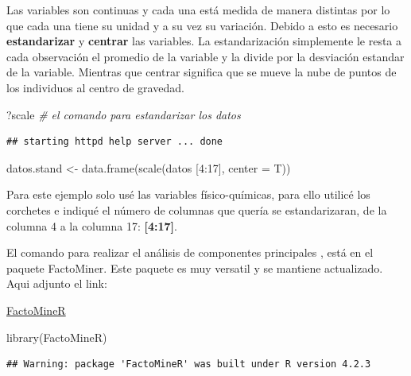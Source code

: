 \documentclass[
]{book}
\newenvironment{Shaded}{\begin{snugshade}}{\end{snugshade}}
\newcommand{\AttributeTok}[1]{\textcolor[rgb]{0.77,0.63,0.00}{#1}}
\newcommand{\CommentTok}[1]{\textcolor[rgb]{0.56,0.35,0.01}{\textit{#1}}}
\newcommand{\DecValTok}[1]{\textcolor[rgb]{0.00,0.00,0.81}{#1}}
\newcommand{\FunctionTok}[1]{\textcolor[rgb]{0.00,0.00,0.00}{#1}}
\newcommand{\NormalTok}[1]{#1}
\newcommand{\OtherTok}[1]{\textcolor[rgb]{0.56,0.35,0.01}{#1}}
\newcommand{\SpecialCharTok}[1]{\textcolor[rgb]{0.00,0.00,0.00}{#1}}
\begin{document}
Las variables son continuas y cada una está medida de manera distintas por lo que cada una tiene su unidad y a su vez su variación. Debido a esto es necesario \textbf{estandarizar} y \textbf{centrar} las variables. La estandarización simplemente le resta a cada observación el promedio de la variable y la divide por la desviación estandar de la variable. Mientras que centrar significa que se mueve la nube de puntos de los individuos al centro de gravedad.

\begin{Shaded}
\begin{Highlighting}[]
\NormalTok{?scale }\CommentTok{\# el comando para estandarizar los datos}
\end{Highlighting}
\end{Shaded}

\begin{verbatim}
## starting httpd help server ... done
\end{verbatim}

\begin{Shaded}
\begin{Highlighting}[]
\NormalTok{datos.stand }\OtherTok{\textless{}{-}} \FunctionTok{data.frame}\NormalTok{(}\FunctionTok{scale}\NormalTok{(datos [}\DecValTok{4}\SpecialCharTok{:}\DecValTok{17}\NormalTok{], }\AttributeTok{center =}\NormalTok{ T))}
\end{Highlighting}
\end{Shaded}

Para este ejemplo solo usé las variables físico-químicas, para ello utilicé los corchetes e indiqué el número de columnas que quería se estandarizaran, de la columna 4 a la columna 17: \textbf{{[}4:17{]}}.

El comando para realizar el análisis de componentes principales , está en el paquete FactoMiner. Este paquete es muy versatil y se mantiene actualizado. Aqui adjunto el link:

\href{http://factominer.free.fr}{FactoMineR}

\begin{Shaded}
\begin{Highlighting}[]
\FunctionTok{library}\NormalTok{(FactoMineR)}
\end{Highlighting}
\end{Shaded}

\begin{verbatim}
## Warning: package 'FactoMineR' was built under R version 4.2.3
\end{verbatim}
\end{document}
